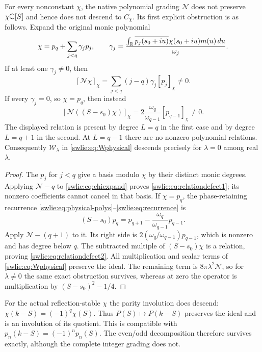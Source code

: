 \begin{swlietheorem}\label{swlie:thm:descent}
For every nonconstant $\chi$, the native polynomial grading
$\mathcal N$ does not preserve $\chi\mathbb C[S]$ and hence
does not descend to $C_\chi$. Its first explicit obstruction
is as follows. Expand the original monic polynomial
\begin{equation}\label{swlie:eq:chiexpand}
 \chi=p_q+\sum_{j<q}\gamma_jp_j,\qquad
 \gamma_j=\frac{\int_\mathbb R\overline{p_j(s_0+iu)}
                \chi(s_0+iu)m(u)\,du}{\omega_j}.
\end{equation}
If at least one $\gamma_j\ne0$, then
\begin{equation}\label{swlie:eq:relationdefect1}
 [\mathcal N\chi]_\chi
       =\sum_{j<q}(j-q)\gamma_j[p_j]_\chi\ne0.
\end{equation}
If every $\gamma_j=0$, so $\chi=p_q$, then instead
\begin{equation}\label{swlie:eq:relationdefect2}
 [\mathcal N((S-s_0)\chi)]_\chi
       =2\frac{\omega_q}{\omega_{q-1}}[p_{q-1}]_\chi\ne0.
\end{equation}
The displayed relation is present by degree $L=q$ in the
first case and by degree $L=q+1$ in the second.
At $L=q-1$ there are no nonzero polynomial relations.
Consequently $\mathcal W_\lambda$ in
\eqref{swlie:eq:Wphysical} descends precisely for $\lambda=0$
among real $\lambda$.
\end{swlietheorem}
\begin{proof}
The $p_j$ for $j<q$ give a basis modulo $\chi$ by their
distinct monic degrees. Applying $\mathcal N-q$ to
\eqref{swlie:eq:chiexpand} proves \eqref{swlie:eq:relationdefect1};
its nonzero coefficients cannot cancel in that basis.
If $\chi=p_q$, the phase-retaining recurrence
\eqref{swlie:eq:physical-polys}--\eqref{swlie:eq:recurrence} is
\[
 (S-s_0)p_q=p_{q+1}
                 -\frac{\omega_q}{\omega_{q-1}}p_{q-1}.
\]
Apply $\mathcal N-(q+1)$ to it. Its right side is
$2(\omega_q/\omega_{q-1})p_{q-1}$, which is nonzero
and has degree below $q$. The subtracted multiple
of $(S-s_0)\chi$ is a relation, proving
\eqref{swlie:eq:relationdefect2}.
All multiplication and scalar terms of
\eqref{swlie:eq:Wphysical} preserve the ideal. The remaining
term is $8\pi\lambda^2\mathcal N$, so for $\lambda\ne0$
the same exact obstruction survives, whereas at zero
the operator is multiplication by $(S-s_0)^2-1/4$.
\end{proof}

For the actual reflection-stable $\chi$ the parity
involution does descend: $\chi(k-S)=(-1)^q\chi(S)$.
Thus $P(S)\mapsto P(k-S)$ preserves the ideal and is
an involution of its quotient. This is compatible
with $p_n(k-S)=(-1)^np_n(S)$.
The even/odd decomposition therefore survives exactly,
although the complete integer grading does not.

